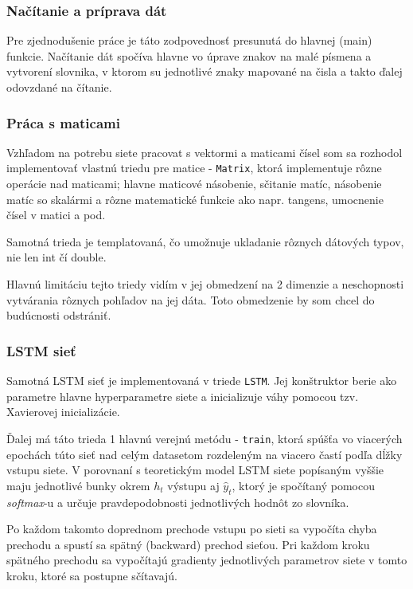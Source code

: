 \documentclass[12pt,a4paper]{article}
\begin{document}
	\subsubsection{Načítanie a príprava dát}
	Pre zjednodušenie práce je táto zodpovednosť presunutá do hlavnej (main) funkcie. Načítanie dát spočíva hlavne vo úprave znakov na malé písmena a vytvorení slovnika, v ktorom su jednotlivé znaky mapované na čisla a takto ďalej odovzdané na čítanie.
	
	\subsubsection{Práca s maticami}
	Vzhľadom na potrebu siete pracovat s vektormi a maticami čísel som sa rozhodol implementovať vlastnú triedu pre matice - \texttt{Matrix}, ktorá implementuje rôzne operácie nad maticami; hlavne maticové násobenie, sčitanie matíc, násobenie matíc so skalármi a rôzne matematické funkcie ako napr. tangens, umocnenie čísel v matici a pod.
	
	Samotná trieda je templatovaná, čo umožnuje ukladanie rôznych dátových typov, nie len int čí double.
	
	Hlavnú limitáciu tejto triedy vidím v jej obmedzení na 2 dimenzie a neschopnosti vytvárania rôznych pohľadov na jej dáta. Toto obmedzenie by som chcel do budúcnosti odstrániť.
	
	\subsubsection{LSTM sieť}
	Samotná LSTM sieť je implementovaná v triede \texttt{LSTM}. Jej konštruktor berie ako parametre hlavne hyperparametre siete a inicializuje váhy pomocou tzv. Xavierovej inicializácie. \cite{DBLP:journals/corr/Kumar17}
	
	Ďalej má táto trieda 1 hlavnú verejnú metódu - \texttt{train}, ktorá spúšťa vo viacerých epochách túto sieť nad celým datasetom rozdeleným na viacero častí podľa dĺžky vstupu siete. V porovnaní s teoretickým model LSTM siete popísaným vyššie maju jednotlivé bunky okrem $h_t$ výstupu aj $\hat{y}_t$, ktorý je spočítaný pomocou \textit{softmax}-u a určuje pravdepodobnosti jednotlivých hodnôt zo slovníka.
	
	Po každom takomto doprednom prechode vstupu po sieti sa vypočíta chyba prechodu a spustí sa spätný (backward) prechod sieťou. Pri každom kroku spätného prechodu sa vypočítajú gradienty jednotlivých parametrov siete v tomto kroku, ktoré sa postupne sčítavajú.
	
\end{document}
